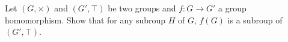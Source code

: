 Let $(G, \times)$ and $(G', \top)$ be two groups and $f : G \longrightarrow G'$ a group homomorphism.
Show that for any subroup $H$ of $G$, $f(G)$ is a subroup of $(G', \top)$.